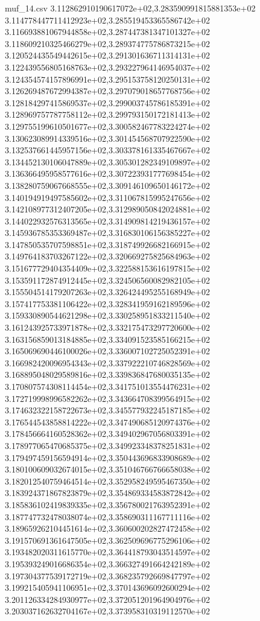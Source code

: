 \begin{filecontents*}{muf_14.csv}
3.112862910190617072e+02,3.283590991815881353e+02
3.114778447711412923e+02,3.285519453365586742e+02
3.116693881067944858e+02,3.287447381347101327e+02
3.118609210325466279e+02,3.289374775786873215e+02
3.120524435549442615e+02,3.291301636711314131e+02
3.122439556805168763e+02,3.293227964146954037e+02
3.124354574157896991e+02,3.295153758120250131e+02
3.126269487672994387e+02,3.297079018657768756e+02
3.128184297415869537e+02,3.299003745786185391e+02
3.128969757787758112e+02,3.299793150172181413e+02
3.129755199610501677e+02,3.300582467783224274e+02
3.130623089914339516e+02,3.301454568707922590e+02
3.132537661445957156e+02,3.303378161335467667e+02
3.134452130106047889e+02,3.305301282349109897e+02
3.136366495958577616e+02,3.307223931777698454e+02
3.138280759067668555e+02,3.309146109650146172e+02
3.140194919497585602e+02,3.311067815995247656e+02
3.142108977312407205e+02,3.312989050842024881e+02
3.144022932576313565e+02,3.314909814219436157e+02
3.145936785353369487e+02,3.316830106156385227e+02
3.147850535707598851e+02,3.318749926682166915e+02
3.149764183703267122e+02,3.320669275825684963e+02
3.151677729404354409e+02,3.322588153616197815e+02
3.153591172874912445e+02,3.324506560082982105e+02
3.155504514179207263e+02,3.326424495255168949e+02
3.157417753381106422e+02,3.328341959162189596e+02
3.159330890544621298e+02,3.330258951833211540e+02
3.161243925733971878e+02,3.332175473297720600e+02
3.163156859013184885e+02,3.334091523585166215e+02
3.165069690446100026e+02,3.336007102725052391e+02
3.166982420096954343e+02,3.337922210746828569e+02
3.168895048029589816e+02,3.339836847680035135e+02
3.170807574308114454e+02,3.341751013554476231e+02
3.172719998996582262e+02,3.343664708399564915e+02
3.174632322158722673e+02,3.345577932245187185e+02
3.176544543858814222e+02,3.347490685120974376e+02
3.178456664160528362e+02,3.349402967056803391e+02
3.178977065470685375e+02,3.349923348378251831e+02
3.179497459156594914e+02,3.350443696833908689e+02
3.180100609032674015e+02,3.351046766766658038e+02
3.182012540759464514e+02,3.352958249595467350e+02
3.183924371867823879e+02,3.354869334583872842e+02
3.185836102419839335e+02,3.356780021763952391e+02
3.187747732478038074e+02,3.358690311167711116e+02
3.189659262104451614e+02,3.360600202827472458e+02
3.191570691361647505e+02,3.362509696775296106e+02
3.193482020311615770e+02,3.364418793043514597e+02
3.195393249016686354e+02,3.366327491664242189e+02
3.197304377539172719e+02,3.368235792669847797e+02
3.199215405941106951e+02,3.370143696092600294e+02
3.201126334284930977e+02,3.372051201964904976e+02
3.203037162632704167e+02,3.373958310319112570e+02

\end{filecontents*}
